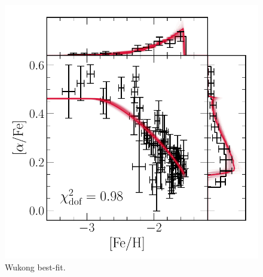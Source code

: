 \documentclass[ms.tex]{subfiles}
\begin{document}
\begin{figure}
\centering
\includegraphics[scale = 0.55]{wukong_bestfit.pdf}
\caption{Wukong best-fit.}
\label{fig:wukong_bestfit}
\end{figure}
\end{document}
